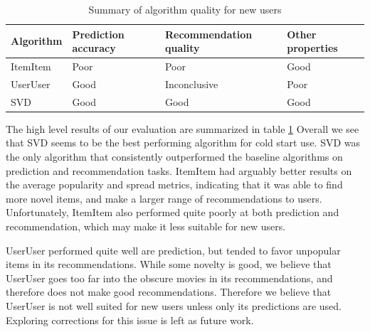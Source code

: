 \documentclass[letterpaper]{sig-alternate}
\begin{document}
    
  \begin{table}[ht!]
    \centering
    \begin{tabular}{|p{4.5em}|p{4.5em}|p{7.5em}|p{4.5em}|}
      \hline
      Algorithm & Prediction accuracy & Recommendation quality      & Other properties \\\hline
      ItemItem  & Poor                & Poor                        & Good             \\\hline
      UserUser  & Good                & Inconclusive                & Poor             \\\hline
      SVD       & Good                & Good                        & Good             \\\hline
    \end{tabular}
    \caption{Summary of algorithm quality for new users}
    \label{tbl:results}
  \end{table}

  The high level results of our evaluation are summarized in table \ref{tbl:results}
  Overall we see that SVD seems to be the best performing algorithm for cold start use.
  SVD was the only algorithm that consistently outperformed the baseline algorithms on prediction and recommendation tasks.
  ItemItem had arguably better results on the average popularity and spread metrics, indicating that it was able to find more novel items, and make a larger range of recommendations to users.
  Unfortunately, ItemItem also performed quite poorly at both prediction and recommendation, which may make it less suitable for new users.

  UserUser performed quite well are prediction, but tended to favor unpopular items in its recommendations.
  While some novelty is good, we believe that UserUser goes too far into the obscure movies in its recommendations, and therefore does not make good recommendations.
  Therefore we believe that UserUser is not well suited for new users unless only its predictions are used.
  Exploring corrections for this issue is left as future work.
\end{document}
